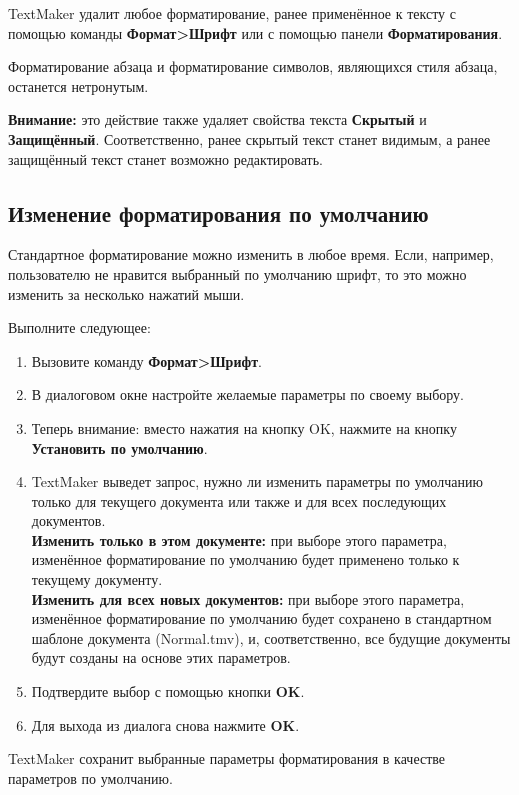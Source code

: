 ﻿\documentclass[a4paper,10pt]{article}
\begin{document}
TextMaker удалит любое форматирование, ранее применённое к тексту с помощью команды \textbf{Формат>Шрифт} или с помощью панели \textbf{Форматирования}.

Форматирование абзаца и форматирование символов, являющихся стиля абзаца, останется нетронутым.

\begin{mdframed}[backgroundcolor=blue!10]
\textbf{Внимание:} это действие также удаляет свойства текста \textbf{Скрытый} и \textbf{Защищённый}. Соответственно, ранее скрытый текст станет видимым, а ранее защищённый текст станет возможно редактировать.
\end{mdframed}

\subsection{Изменение форматирования по умолчанию}
Стандартное форматирование можно изменить в любое время. Если, например, пользователю не нравится выбранный по умолчанию шрифт, то это можно изменить за несколько нажатий мыши.

Выполните следующее:
\begin{enumerate}
 \item Вызовите команду \textbf{Формат>Шрифт}.
 \item В диалоговом окне настройте желаемые параметры по своему выбору.
 \item Теперь внимание: вместо нажатия на кнопку OK, нажмите на кнопку \textbf{Установить по умолчанию}.
 \item TextMaker выведет запрос, нужно ли изменить параметры по умолчанию только для текущего документа или также и для всех последующих документов.\\
\textbf{Изменить только в этом документе:} при выборе этого параметра, изменённое форматирование по умолчанию будет применено только к текущему документу.\\
\textbf{Изменить для всех новых документов:} при выборе этого параметра, изменённое форматирование по умолчанию будет сохранено в стандартном шаблоне документа (Normal.tmv), и, соответственно, все будущие документы будут созданы на основе этих параметров.
\item Подтвердите выбор с помощью кнопки \textbf{OK}.
\item Для выхода из диалога снова нажмите \textbf{OK}.
\end{enumerate}

TextMaker сохранит выбранные параметры форматирования в качестве параметров по умолчанию.
\end{document}
